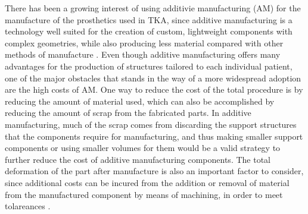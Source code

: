 \documentclass[../main.tex]{subfiles}
\begin{document}
There has been a growing interest of using additivie manufacturing (AM) for the manufacture of the prosthetics used in TKA, since additive manufacturing is a technology well suited for the creation of custom, lightweight components with complex geometries, while also producing less material compared with other methods of manufacture \cite{narraAdditiveManufacturingTotal2019}. Even though additive manufacturing offers many advantages for the production of structures tailored to each individual patient, one of the major obstacles that stands in the way of a more widespread adoption are the high costs of AM. One way to reduce the cost of the total procedure is by reducing the amount of material used, which can also be accomplished by reducing the amount of scrap from the fabricated parts.  In additive manufacturing, much of the scrap comes from discarding the support structures that the components require for manufacturing, and thus making smaller support components or using smaller volumes for them would be a valid strategy to further reduce the cost of additive manufacturing components. The total deformation of the part after manufacture is also an important factor to consider, since additional costs can be incured from the addition or removal of material from the manufactured component by means of machining, in order to meet tolareances \cite{narraAdditiveManufacturingTotal2019} \cite{MetalAdditiveManufacturing}. 
\end{document}
